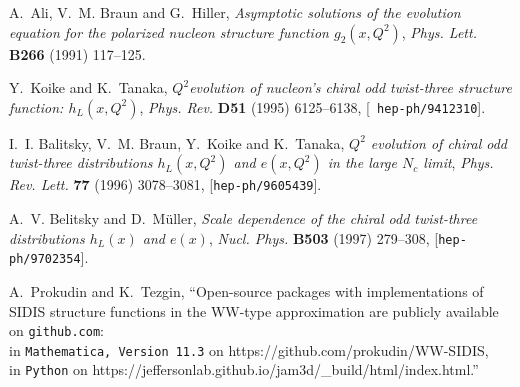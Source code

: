 \documentclass[a4paper,11pt]{article}
\begin{document}
\providecommand{\href}[2]{#2}\begingroup\raggedright\begin{thebibliography}{1}

A.~Ali, V.~M. Braun and G.~Hiller, \emph{{Asymptotic solutions of the evolution
  equation for the polarized nucleon structure function $g_2 (x, Q^2)$}},
  \href{http://dx.doi.org/10.1016/0370-2693(91)90753-D}{\emph{Phys. Lett.} {\bf
  B266} (1991) 117--125}.

Y.~Koike and K.~Tanaka, \emph{{$Q^2 $evolution of nucleon's chiral odd
  twist-three structure function: $h_L (x, Q^2)$}},
  \href{http://dx.doi.org/10.1103/PhysRevD.51.6125}{\emph{Phys. Rev.} {\bf D51}
  (1995) 6125--6138}, [\href{https://arxiv.org/abs/hep-ph/9412310}{{\tt
  hep-ph/9412310}}].

I.~I. Balitsky, V.~M. Braun, Y.~Koike and K.~Tanaka, \emph{{$Q^2$ evolution of
  chiral odd twist-three distributions $h_L(x,Q^2)$ and $e(x,Q^2)$ in the large
  $N_c$ limit}},
  \href{http://dx.doi.org/10.1103/PhysRevLett.77.3078}{\emph{Phys. Rev. Lett.}
  {\bf 77} (1996) 3078--3081},
  [\href{https://arxiv.org/abs/hep-ph/9605439}{{\tt hep-ph/9605439}}].

A.~V. Belitsky and D.~{M\"u}ller, \emph{{Scale dependence of the chiral odd
  twist-three distributions $h_L(x)$ and $e(x)$}},
  \href{http://dx.doi.org/10.1016/S0550-3213(97)00432-X}{\emph{Nucl. Phys.}
  {\bf B503} (1997) 279--308},
  [\href{https://arxiv.org/abs/hep-ph/9702354}{{\tt hep-ph/9702354}}].

A.~Prokudin and K.~Tezgin, ``{Open-source packages with implementations of
  SIDIS structure functions in the WW-type approximation are publicly available
  on \texttt{github.com}: \\ in \texttt{Mathematica, {V}ersion 11.3} on {\href{
  https://github.com/prokudin/WW-SIDIS}{
  https://github.com/prokudin/WW-SIDIS}},\\ in \texttt{Python} on {\href{
  https://jeffersonlab.github.io/jam3d/_build/html/index.html}{
  https://jeffersonlab.github.io/jam3d/\_build/html/index.html}}}.''

\end{thebibliography}\endgroup
\end{document}
